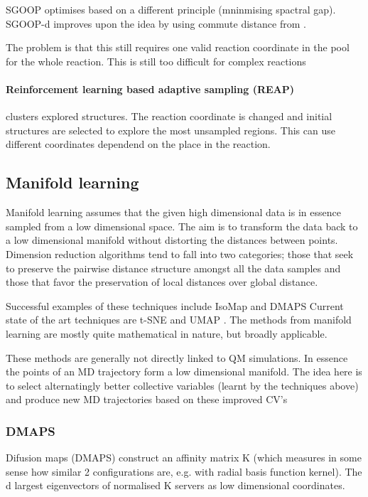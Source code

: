 \documentclass{article}
\begin{document}
SGOOP \cite{Tiwary2016} optimises based on a different principle (mninmising spactral gap). SGOOP-d improves upon the idea by using commute distance from \cite{noe2016}.

The problem is that this still requires one valid reaction coordinate in the pool for the whole reaction. This is still too difficult for complex reactions

\paragraph{Reinforcement learning based adaptive sampling (REAP) } \cite{Shamsi2018} clusters explored structures. The reaction coordinate is changed and initial structures are selected to explore the most unsampled regions. This can use different coordinates dependend on the place in the reaction.

\subsection{Manifold learning}

Manifold learning assumes that the given high dimensional data is in essence sampled from a low dimensional space. The aim is to transform the data back to a low dimensional manifold without distorting the distances between points. Dimension reduction algorithms tend to fall into two categories; those that seek to preserve the pairwise distance structure amongst all the data samples and those that favor the preservation of local distances over global distance. \cite{McInnes2018}

Successful examples of these techniques include IsoMap \cite{Tenenbaum1995} and DMAPS \cite{Coifman2006} Current state of the art techniques are  t-SNE \cite{vanDerMaarten2008} and  UMAP  \cite{McInnes2018}. The methods from manifold learning are mostly quite mathematical in nature, but broadly applicable.

These methods are generally not directly linked to QM simulations. In essence the points of an MD trajectory form a low dimensional manifold. The idea here is to select alternatingly better collective variables (learnt by the techniques above) and produce new MD trajectories based on these improved CV's

\subsubsection{DMAPS}

Difusion maps (DMAPS)\cite{Coifman2006} construct an affinity matrix K (which measures in some sense how similar 2 configurations are, e.g. with radial basis function kernel). The d largest eigenvectors of normalised K servers as low dimensional coordinates.
\end{document}
